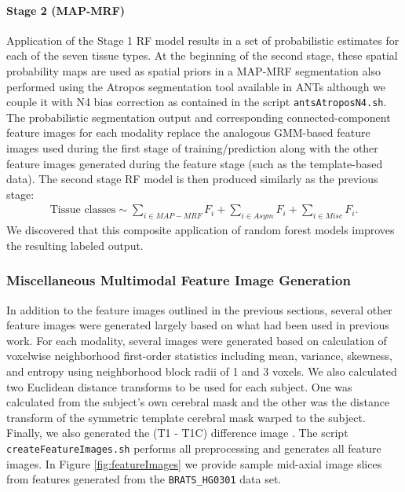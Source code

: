 \documentclass[preprint,authoryear,review,12pt]{elsarticle}
\begin{document}
\paragraph{Stage 2 (MAP-MRF)}

Application of the Stage 1 RF model results in a set of
probabilistic estimates for each of the seven tissue types.  
At the beginning of the second stage, these spatial probability maps are 
used as spatial priors in a 
MAP-MRF segmentation also performed using the Atropos 
segmentation tool \citep{avants2011} available in ANTs although we couple
it with N4 bias correction \citep{tustison2010} as contained in the script
{\tt antsAtroposN4.sh}.  The probabilistic segmentation output and corresponding
connected-component feature images for each modality replace the analogous 
GMM-based feature images used 
during the first stage of training/prediction along with the other feature
images generated during the feature stage (such as the template-based data).
The second stage RF model is then produced similarly as the previous stage: 
\begin{align}
\label{eq:mapmrf}
\mathrm{Tissue}\,\,\mathrm{classes} \sim \sum_{i \in MAP-MRF} F_i + \sum_{i \in Asym} F_i + \sum_{i \in Misc} F_i.
\end{align}
We discovered that this composite application of random
forest models improves the resulting labeled output.

\subsubsection{Miscellaneous Multimodal Feature Image Generation}
\label{sec:misc}

In addition to the feature images outlined in the previous sections, 
several other feature images were generated largely based on what 
had been used in previous work.  For each modality, several images
were generated based on calculation of voxelwise neighborhood 
first-order statistics including mean, variance, skewness, and entropy
using neighborhood block radii
of 1 and 3 voxels.  We also calculated two Euclidean distance
transforms \citep{maurer2003} to be used for each subject.  One was
calculated from the subject's own cerebral mask and the other was the 
distance transform of the symmetric template cerebral mask warped
to the subject.  Finally, we also generated the  (T1 - T1C) difference 
image \citep{prastawa2003}.
The script {\tt createFeatureImages.sh} performs all preprocessing
and generates all feature images.  In Figure \ref{fig:featureImages} we provide sample mid-axial 
image slices from features generated from the {\tt BRATS\_HG0301} data set.
\end{document}
